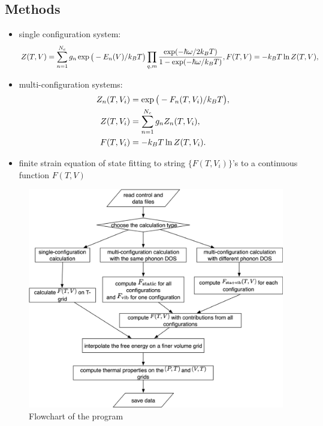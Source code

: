 \documentclass[13pt,aspectratio=169]{beamer}
\begin{document}
\subsection{Methods}
\begin{frame}[allowframebreaks]{\subsecname}
	\begin{itemize}
		\item single configuration system: \begin{equation}\footnotesize
			      Z(T, V) = \sum_{n=1}^{N_c} g_n \exp\big( -{E_n(V)}/{k_B T} \big) \prod_{q, m} \frac{\exp(-\hbar \omega/2k_B T)}{1 - \exp(-\hbar \omega/k_B T)}, F(T, V) = -k_B T \ln Z(T, V),
		      \end{equation}
		\item multi-configuration systems: \begin{align}\footnotesize
			      Z_n (T, V_i) & = \exp \big( -{ F_n (T, V_i) }/{ k_B T } \big), \\
			      Z(T, V_i)    & = \sum_{n=1}^{N_c} g_n Z_n (T, V_i),            \\
			      F(T, V_i)    & = -k_B T \ln Z(T, V_i).
		      \end{align}
		\item finite strain equation of state fitting to string $\{F(T, V_i)\}$’s to a continuous function $F(T, V)$
	\end{itemize}

	\begin{figure}
		\includegraphics[height=0.8\textheight]{images/flow}%
		\caption{Flowchart of the program}
	\end{figure}
\end{frame}
\end{document}
